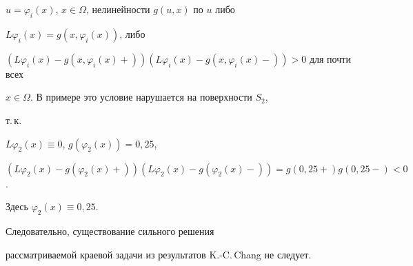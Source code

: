 $u=\varphi_i(x)$, $x\in\Omega$, нелинейности $g(u,x)$ по $u$ либо 


$L\varphi_i(x)=g(x,\varphi_i(x))$, либо 


$(L\varphi_i(x)-g(x,\varphi_i(x)+))(L\varphi_i(x)- 


g(x,\varphi_i(x)-))>0$ для почти всех 


$x\in\Omega$. В примере это условие нарушается на поверхности $S_2$, 


т.\,к. 


$L\varphi_2(x)\equiv 0$, $g(\varphi_2(x))=0,25$, 


$(L\varphi_2(x)-g(\varphi_2(x)+))(L\varphi_2(x)- 


g(\varphi_2(x)-))=g(0,25+)g(0,25-)<0$. 


Здесь $\varphi_2(x)\equiv 0,25$. 


Следовательно, существование сильного решения 


рассматриваемой краевой задачи из результатов K.-C.\,Chang не следует. 


 



